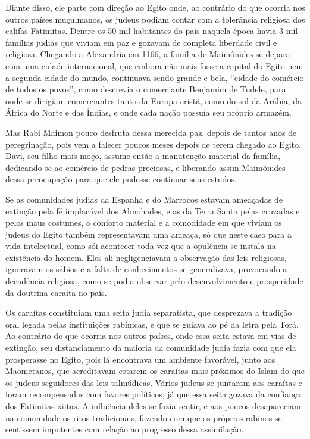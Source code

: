 Diante disso, ele parte com direção ao Egito onde, ao contrário do que
ocorria nos outros países muçulmanos, os judeus podiam contar com a
tolerância religiosa dos califas Fatimitas. Dentre os 50 mil habitantes
do país naquela época havia 3 mil famílias judias que viviam em paz e
gozavam de completa liberdade civil e religiosa. Chegando a Alexandria
em 1166, a família de Maimônides se depara com uma cidade internacional,
que embora não mais fosse a capital do Egito nem a segunda cidade do
mundo, continuava sendo grande e bela, ``cidade do comércio de todos os
povos'', como descrevia o comerciante Benjamim de Tudele, para onde se
dirigiam comerciantes tanto da Europa cristã, como do sul da Arábia, da
África do Norte e das Índias, e onde cada nação possuía seu próprio
armazém.

Mas Rabi Maimon pouco desfruta dessa merecida paz, depois de tantos
anos de peregrinação, pois vem a falecer poucos meses depois de terem
chegado ao Egito. Davi, seu filho mais moço, assume então a manutenção
material da família, dedicando-se ao comércio de pedras preciosas, e
liberando assim Maimônides dessa preocupação para que ele pudesse
continuar seus estudos.

Se as comunidades judias da Espanha e do Marrocos estavam ameaçadas de
extinção pela fé implacável dos Almohades, e as da Terra Santa pelas
cruzadas e pelos maus costumes, o conforto material e a comodidade em
que viviam os judeus do Egito também representavam uma ameaça, só que
neste caso para a vida intelectual, como sói acontecer toda vez que a
opulência se instala na existência do homem. Eles ali negligenciavam a
observação das leis religiosas, ignoravam os sábios e a falta de
conhecimentos se generalizava, provocando a decadência religiosa, como
se podia observar pelo desenvolvimento e prosperidade da doutrina
caraíta no país.

Os caraítas constituíam uma seita judia separatista, que desprezava a
tradição oral legada pelas instituições rabínicas, e que se guiava ao pé
da letra pela Torá. Ao contrário do que ocorria nos outros
países, onde essa seita estava em vias de extinção, seu distanciamento
da maioria da comunidade judia fazia com que ela prosperasse no Egito, pois lá encontrava um ambiente
favorável, junto aos Maometanos, que acreditavam estarem os caraítas
mais próximos do Islam do que os judeus seguidores das leis talmúdicas.
Vários judeus se juntaram aos caraítas e foram recompensados com favores
políticos, já que essa seita gozava da confiança dos Fatimitas xiitas. A
influência deles se fazia sentir, e aos poucos desapareciam na
comunidade os ritos tradicionais, fazendo com que os próprios rabinos
se sentissem impotentes com relação ao progresso dessa assimilação.

